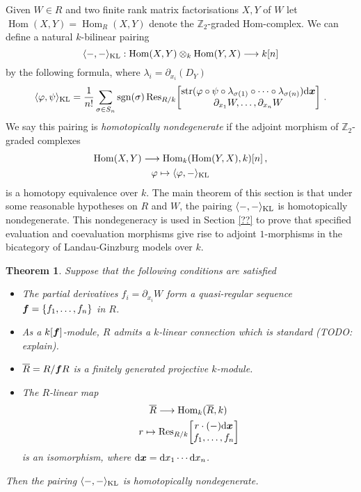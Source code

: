 \documentclass{compositio}
\newtheorem{theorem}{Theorem}[section]
\theoremstyle{definition}
\numberwithin{equation}{section}
\newcommand{\Ress}[1]{\res_{#1}\!}
\def\res{\operatorname{Res}}
\def\sgn{\operatorname{sgn}}
\def\Hom{\operatorname{Hom}}
\DeclareMathOperator{\str}{str}
\begin{document}
Given $W \in R$ and two finite rank matrix factorisations $X,Y$ of $W$ let $\Hom(X,Y) = \Hom_R(X,Y)$ denote the $\mathbb{Z}_2$-graded Hom-complex. We can define a natural $k$-bilinear pairing
\[
\langle -, - \rangle_{\textup{KL}}: \Hom(X,Y) \otimes_k \Hom(Y,X) \lto k[n]
\]
by the following formula, where $\lambda_i = \partial_{x_i}(D_Y)$
\[
\langle \varphi, \psi \rangle_{\textup{KL}} = \frac{1}{n!} \sum_{\sigma \in S_n} \sgn(\sigma) \Ress{R/k}\begin{bmatrix} \str( \varphi \circ \psi \circ \lambda_{\sigma(1)} \circ \cdots \circ \lambda_{\sigma(n)} ) \ud \bs{x} \\ \partial_{x_1} W, \ldots, \partial_{x_n} W \end{bmatrix}\,.
\]
We say this pairing is \emph{homotopically nondegenerate} if the adjoint morphism of $\mathbb{Z}_2$-graded complexes
\begin{gather*}
\Hom(X,Y) \lto \Hom_k( \Hom(Y,X), k )[n]\,,\\
\varphi \mapsto \langle \varphi, - \rangle_{\textup{KL}}
\end{gather*}
is a homotopy equivalence over $k$. The main theorem of this section is that under some reasonable hypotheses on $R$ and $W$, the pairing $\langle -, - \rangle_{\textup{KL}}$ is homotopically nondegenerate. This nondegeneracy is used in Section \ref{??} to prove that specified evaluation and coevaluation morphisms give rise to adjoint $1$-morphisms in the bicategory of Landau-Ginzburg models over $k$.

\begin{theorem} Suppose that the following conditions are satisfied
\begin{itemize}
\item[(H1)] The partial derivatives $f_i = \partial_{x_i} W$ form a quasi-regular sequence $\boldsymbol{f} = \{f_1,\ldots,f_n\}$ in $R$.
\item[(H2)] As a $k[\boldsymbol{f}]$-module, $R$ admits a $k$-linear connection which is standard (TODO: explain).
\item[(H3)] $\overline{R} = R/\boldsymbol{f}R$ is a finitely generated projective $k$-module.
\item[(H4)] The $R$-linear map
\begin{gather*}
\overline{R} \lto \Hom_k( \overline{R}, k)\,\\
r \mapsto \Ress{R/k}\begin{bmatrix} r \cdot (-) \ud \bs{x} \\ f_1, \ldots, f_n \end{bmatrix}
\end{gather*}
is an isomorphism, where $\mathrm{d} \boldsymbol{x} = \mathrm{d} x_1 \cdots \mathrm{d} x_n$.
\end{itemize}
Then the pairing $\langle -, - \rangle_{\textup{KL}}$ is homotopically nondegenerate.
\end{theorem}
\end{document}
